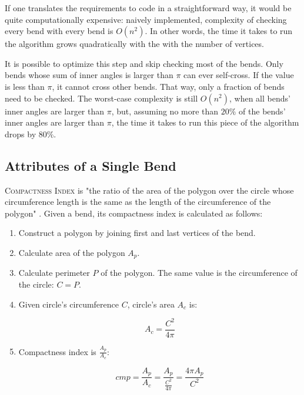 \documentclass[a4paper]{article}
\begin{document}
If one translates the requirements to code in a straightforward way, it would
be quite computationally expensive: naively implemented, complexity of checking
every bend with every bend is $O(n^2)$. In other words, the time it takes to
run the algorithm grows quadratically with the with the number of vertices.

It is possible to optimize this step and skip checking most of the bends. Only
bends whose sum of inner angles is larger than $\pi$ can ever self-cross. If
the value is less than $\pi$, it cannot cross other bends. That way, only a
fraction of bends need to be checked. The worst-case complexity is still
$O(n^2)$, when all bends' inner angles are larger than $\pi$, but, assuming no
more than $20\%$ of the bends' inner angles are larger than $\pi$, the time it
takes to run this piece of the algorithm drops by $80\%$.

\subsection{Attributes of a Single Bend}

\textsc{Compactness Index} is "the ratio of the area of the polygon over the
circle whose circumference length is the same as the length of the
circumference of the polygon" \cite{wang1998line}. Given a bend, its
compactness index is calculated as follows:

\begin{enumerate}

  \item Construct a polygon by joining first and last vertices of the bend.

  \item Calculate area of the polygon $A_p$.

  \item Calculate perimeter $P$ of the polygon. The same value is the
      circumference of the circle: $C = P$.

  \item Given circle's circumference $C$, circle's area $A_c$ is:

    \[
      A_{c} = \frac{C^2}{4\pi}
    \]

  \item Compactness index is $\frac{A_p}{A_c}$:

    \[
      cmp = \frac{A_p}{A_c} =
        \frac{A_p}{ \frac{C^2}{4\pi} } =
        \frac{4\pi A_p}{C^2}
    \]

\end{enumerate}
\end{document}
